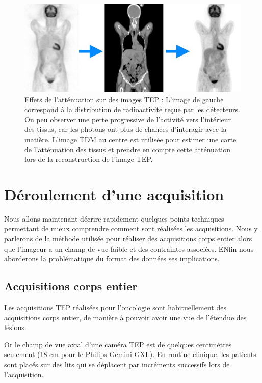 \begin{figure}
\centering
\includegraphics[width=12cm]{images/attenuationNonAtt}
\caption[Effet de l'atténuation sur les images TEP]{Effets de l'atténuation sur des images TEP : L'image de gauche correspond à la distribution de radioactivité reçue par les détecteurs. On peu observer une perte progressive de l'activité vers l'intérieur des tissus, car les photons ont plus de chances d'interagir avec la matière. L'image TDM au centre est utilisée pour estimer une carte de l'atténuation des tissus et prendre en compte cette atténuation lors de la reconstruction de l'image TEP.}
\label{fig:schemaAtt}
\end{figure}


\chapter{Déroulement d'une acquisition}

Nous allons maintenant décrire rapidement quelques points techniques permettant de mieux comprendre comment sont réalisées les acquisitions. Nous y parlerons de la méthode utilisée pour réaliser des acquisitions corps entier alors que l'imageur a un champ de vue faible et des contraintes associées. ENfin nous aborderons la problématique du format des données ses implications.

	\section{Acquisitions corps entier}


Les acquisitions TEP réalisées pour l'oncologie sont habituellement des acquisitions corps entier, de manière à pouvoir avoir une vue de l'étendue des lésions.

Or le champ de vue axial d'une caméra TEP est de quelques centimètres seulement (18 cm pour le Philips Gemini GXL). En routine clinique, les patients sont placés sur des lits qui se déplacent par incréments successifs lors de l'acquisition.

